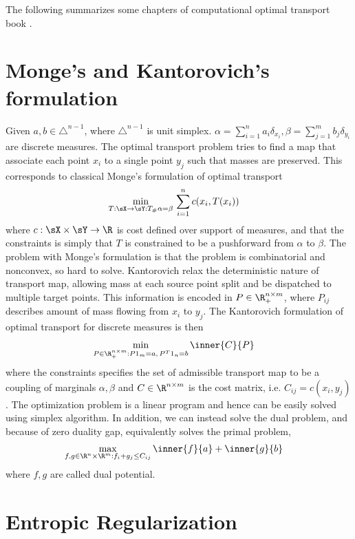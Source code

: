 \documentclass[11pt]{article}
\begin{document}
The following summarizes some chapters of computational optimal transport book \cite{peyreComputationalOptimalTransport2020}.

\section{Monge's and Kantorovich's formulation}

Given $a,b \in \triangle^{n-1}$, where $\triangle^{n-1}$ is unit simplex. $\alpha = \sum_{i=1}^n a_i \delta_{x_i}, \beta = \sum_{j=1}^m b_j \delta_{y_i}$ are discrete measures. The optimal transport problem tries to find a map that associate each point $x_i$ to a single point $y_j$ such that masses are preserved. This corresponds to classical Monge's formulation of optimal transport
\begin{align}
    \min_{T:\sX\to\sY: T_{\#}\alpha = \beta}\,
        &\sum_{i=1}^n c(x_i, T(x_i))
\end{align}
where $c:\sX\times\sY \to\R$ is cost defined over support of measures, and that the constraints is simply that $T$ is constrained to be a pushforward from $\alpha$ to $\beta$. The problem with Monge's formulation is that the problem is combinatorial and nonconvex, so hard to solve. Kantorovich relax the deterministic nature of transport map, allowing mass at each source point split and be dispatched to multiple target points. This information is encoded in $P\in\R^{n\times m}_+$, where $P_{ij}$ describes amount of mass flowing from $x_i$ to $y_j$. The Kantorovich formulation of optimal transport for discrete measures is then
\begin{align}
    \min_{P\in\R^{n\times m}_+: P1_m = a,\, P^T1_n = b}\,
        &\inner{C}{P}
\end{align}
where the constraints specifies the set of admissible transport map to be a coupling of marginals $\alpha,\beta$ and $C\in\R^{n\times m}$ is the cost matrix, i.e. $C_{ij} = c(x_i,y_j)$. The optimization problem is a linear program and hence can be easily solved using simplex algorithm. In addition, we can instead solve the dual problem, and because of zero duality gap, equivalently solves the primal problem,
\begin{align}
    \max_{f,g\in\R^n\times\R^m: f_i+g_j \leq C_{ij}}\,
        &\inner{f}{a} + \inner{g}{b} 
\end{align}
where $f,g$ are called dual potential.

\section{Entropic Regularization}
\end{document}
